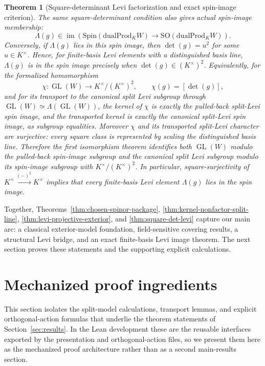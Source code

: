 \documentclass{birkjour}
\theoremstyle{plain}
\newtheorem{theorem}{Theorem}[section]
\theoremstyle{definition}
\theoremstyle{remark}
\newcommand{\Spin}{\mathrm{Spin}}
\newcommand{\SO}{\mathrm{SO}}
\newcommand{\dualProd}{\mathrm{dualProd}}
\begin{document}
\begin{theorem}[Square-determinant Levi factorization and exact spin-image criterion]
The same square-determinant condition also gives actual spin-image membership:
\[
  \Lambda(g)\in
  \operatorname{im}(\Spin(\dualProd_K W)\to\SO(\dualProd_K W)).
\]
Conversely, if $\Lambda(g)$ lies in this spin image, then
\(\det(g)=u^2\) for some \(u\in K^\times\). Hence, for finite-basis Levi
elements with a distinguished basis line, \(\Lambda(g)\) is in the spin image
precisely when \(\det(g)\in (K^\times)^2\).
Equivalently, for the formalized homomorphism
\[
  \chi:\operatorname{GL}(W)\longrightarrow K^\times/(K^\times)^2,\qquad
  \chi(g)=[\det(g)],
\]
and for its transport to the canonical split Levi subgroup through
\(\operatorname{GL}(W)\simeq \Lambda(\operatorname{GL}(W))\), the kernel of
\(\chi\) is exactly the pulled-back split-Levi spin image, and the transported
kernel is exactly the canonical split-Levi spin image, as subgroup equalities. Moreover
\(\chi\) and its transported split-Levi character are surjective: every square
class is represented by scaling the distinguished basis line.
Therefore the first isomorphism theorem identifies both \(\operatorname{GL}(W)\)
modulo the pulled-back spin-image subgroup and the canonical split Levi subgroup modulo its
spin-image subgroup with \(K^\times/(K^\times)^2\).
In particular, square-surjectivity of
$K^\times\xrightarrow{(-)^2}K^\times$ implies that every finite-basis Levi element
$\Lambda(g)$ lies in the spin image.
\end{theorem}

Together, Theorems~{}\ref{thm:chosen-spinor-package},
\ref{thm:kernel-nonfactor-split-line},
\ref{thm:levi-projective-exterior}, and
\ref{thm:square-det-levi} capture our main arc: a
classical exterior-model foundation, field-sensitive covering results, a
structural Levi bridge, and an exact finite-basis Levi image theorem. The next
section proves these statements and the supporting explicit calculations.

\section{Mechanized proof ingredients}
\label{sec:highlights}

This section isolates the split-model calculations, transport lemmas, and
explicit orthogonal-action formulas that underlie the theorem statements of
Section~{}\ref{sec:results}. In the Lean development these are the reusable
interfaces exported by the presentation and orthogonal-action files, so we
present them here as the mechanized proof architecture rather than as a second
main-results section.
\end{document}
